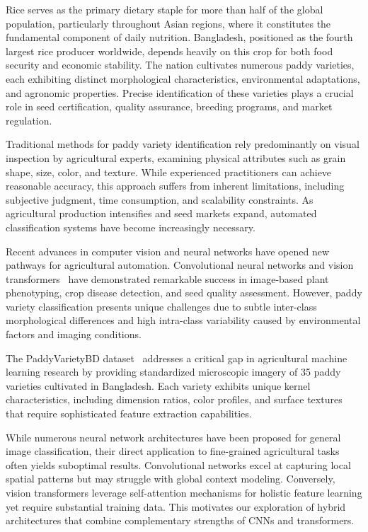 \documentclass[conference]{IEEEtran}
\begin{document}
Rice serves as the primary dietary staple for more than half of the global population, particularly throughout Asian regions, where it constitutes the fundamental component of daily nutrition. Bangladesh, positioned as the fourth largest rice producer worldwide, depends heavily on this crop for both food security and economic stability. The nation cultivates numerous paddy varieties, each exhibiting distinct morphological characteristics, environmental adaptations, and agronomic properties. Precise identification of these varieties plays a crucial role in seed certification, quality assurance, breeding programs, and market regulation.

Traditional methods for paddy variety identification rely predominantly on visual inspection by agricultural experts, examining physical attributes such as grain shape, size, color, and texture. While experienced practitioners can achieve reasonable accuracy, this approach suffers from inherent limitations, including subjective judgment, time consumption, and scalability constraints. As agricultural production intensifies and seed markets expand, automated classification systems have become increasingly necessary.

Recent advances in computer vision and neural networks have opened new pathways for agricultural automation. Convolutional neural networks and vision transformers~\cite{vit} have demonstrated remarkable success in image-based plant phenotyping, crop disease detection, and seed quality assessment. However, paddy variety classification presents unique challenges due to subtle inter-class morphological differences and high intra-class variability caused by environmental factors and imaging conditions.

The PaddyVarietyBD dataset~\cite{dataset} addresses a critical gap in agricultural machine learning research by providing standardized microscopic imagery of 35 paddy varieties cultivated in Bangladesh. Each variety exhibits unique kernel characteristics, including dimension ratios, color profiles, and surface textures that require sophisticated feature extraction capabilities.

While numerous neural network architectures have been proposed for general image classification, their direct application to fine-grained agricultural tasks often yields suboptimal results. Convolutional networks excel at capturing local spatial patterns but may struggle with global context modeling. Conversely, vision transformers leverage self-attention mechanisms for holistic feature learning yet require substantial training data. This motivates our exploration of hybrid architectures that combine complementary strengths of CNNs and transformers.
\end{document}

